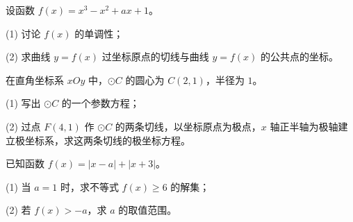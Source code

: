 \begin{question}
设函数 $f(x)=x^3-x^2+ax+1$。

(1) 讨论 $f(x)$ 的单调性；

(2) 求曲线 $y=f(x)$ 过坐标原点的切线与曲线 $y=f(x)$ 的公共点的坐标。

\end{question}
\begin{question}
在直角坐标系 $xOy$ 中，$\odot C$ 的圆心为 $C(2,1)$，半径为 $1$。

(1) 写出 $\odot C$ 的一个参数方程；

(2) 过点 $F(4,1)$ 作 $\odot C$ 的两条切线，以坐标原点为极点，$x$ 轴正半轴为极轴建立极坐标系，求这两条切线的极坐标方程。

\end{question}
\begin{question}
已知函数 $f(x)=|x-a|+|x+3|$。

(1) 当 $a=1$ 时，求不等式 $f(x)\geqslant6$ 的解集；

(2) 若 $f(x)>-a$，求 $a$ 的取值范围。

\makeatletter{}\ifx\@currenvir\gkanswerblock\else\clearpage\fi\makeatother

\end{question}